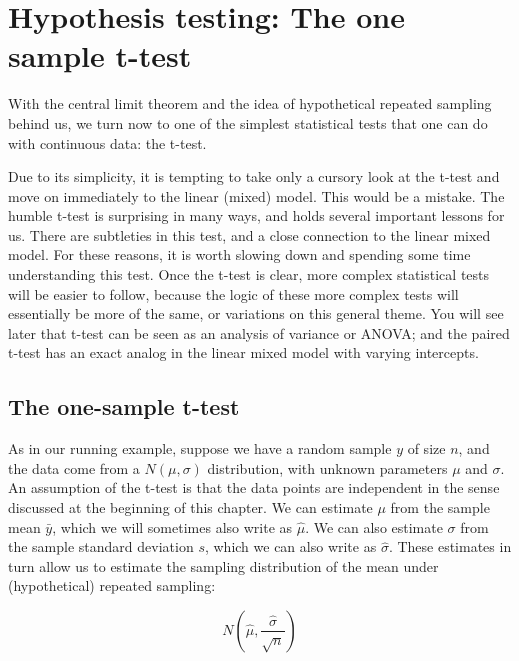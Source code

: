 \documentclass[
  12pt,
]{krantz}
\theoremstyle{definition}
\theoremstyle{definition}
\theoremstyle{definition}
\theoremstyle{definition}
\theoremstyle{remark}
\begin{document}
\hypertarget{hypothesis-testing-the-one-sample-t-test}{%
\section{Hypothesis testing: The one sample t-test}\label{hypothesis-testing-the-one-sample-t-test}}

With the central limit theorem and the idea of hypothetical repeated sampling behind us, we turn now to one of the simplest statistical tests that one can do with continuous data: the t-test.

Due to its simplicity, it is tempting to take only a cursory look at the t-test and move on immediately to the linear (mixed) model. This would be a mistake. The humble t-test is surprising in many ways, and holds several important lessons for us. There are subtleties in this test, and a close connection to the linear mixed model. For these reasons, it is worth slowing down and spending some time understanding this test. Once the t-test is clear, more complex statistical tests will be easier to follow, because the logic of these more complex tests will essentially be more of the same, or variations on this general theme. You will see later that t-test can be seen as an analysis of variance or ANOVA; and the paired t-test has an exact analog in the linear mixed model with varying intercepts.

\hypertarget{the-one-sample-t-test}{%
\subsection{The one-sample t-test}\label{the-one-sample-t-test}}

As in our running example, suppose we have a random sample \(y\) of size \(n\), and the data come from a \(N(\mu,\sigma)\) distribution, with unknown parameters \(\mu\) and \(\sigma\). An assumption of the t-test is that the data points are independent in the sense discussed at the beginning of this chapter.
We can estimate \(\mu\) from the sample mean \(\bar{y}\), which we will sometimes also write as \(\hat \mu\). We can also estimate \(\sigma\) from the sample standard deviation \(s\), which we can also write as \(\hat\sigma\). These estimates in turn allow us to estimate the sampling distribution of the mean under (hypothetical) repeated sampling:

\begin{equation}
N(\hat\mu,\frac{\hat \sigma}{\sqrt{n}})
\end{equation}
\end{document}
